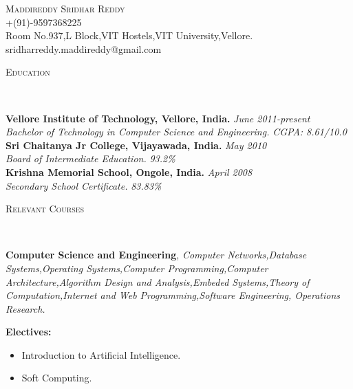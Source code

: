 \documentclass[9pt]{article}
\newenvironment{changemargin}[2]{%
  \begin{list}{}{%
    \setlength{\topsep}{0pt}%
    \setlength{\leftmargin}{#1}%
    \setlength{\rightmargin}{#2}%
    \setlength{\listparindent}{\parindent}%
    \setlength{\itemindent}{\parindent}%
    \setlength{\parsep}{\parskip}%
  }%
  \item[]}{\end{list}
}
\newcommand{\lineover}{
	\begin{changemargin}{-0.05in}{-0.05in}
		\vspace*{-8pt}
		\hrulefill \\
		\vspace*{-2pt}
	\end{changemargin}
}
\newcommand{\header}[1]{
	\begin{changemargin}{-0.5in}{-0.5in}
		\scshape{#1}\\
  	\lineover
	\end{changemargin}
}
\newcommand{\contact}[4]{
	\begin{changemargin}{-0.5in}{-0.5in}
		\begin{center}
			{\Large \scshape {#1}}\\ \smallskip
			{#2}\\ \smallskip 
			{#3}\\ \smallskip
			{#4}\smallskip
		\end{center}
	\end{changemargin}
}
\newenvironment{body} {
	\vspace*{-16pt}
	\begin{changemargin}{-0.25in}{-0.5in}
  }	
	{\end{changemargin}
}
\begin{document}
\contact{Maddireddy Sridhar Reddy}{+(91)-9597368225}{Room No.937,L Block,VIT Hostels,VIT University,Vellore.}{sridharreddy.maddireddy@gmail.com}





\header{Education}

\begin{body}
	\vspace{14pt}
	\textbf{Vellore Institute of Technology, Vellore, India.  }{} \hfill \emph{June 2011-present}{} \\
	\emph{Bachelor of Technology in Computer Science and Engineering.}{} \hfill \emph{CGPA: 8.61/10.0}\\
  \medskip
	\textbf{Sri Chaitanya Jr College, Vijayawada, India.} \hfill \emph{May 2010} \\
	\emph{Board of Intermediate Education.} \hfill \emph{93.2\%}\\
 \medskip
	\textbf{Krishna Memorial School, Ongole, India.} \hfill \emph{April 2008} \\
	\emph{Secondary School Certificate.} \hfill \emph{83.83\%}\\
\end{body}

\header{Relevant Courses}

\begin{body}
	\vspace{14pt}
	\textbf{Computer Science and Engineering}, \emph{Computer Networks,Database Systems,Operating Systems,Computer Programming,Computer Architecture,Algorithm Design and Analysis,Embeded Systems,Theory of Computation,Internet and Web Programming,Software Engineering, Operations Research.}\\
	\vspace*{-4pt}
	\medskip

	\textbf {Electives:}
	\vspace*{-4pt}
	\begin{itemize} \itemsep -0pt
		\item Introduction to Artificial Intelligence.
		\item Soft Computing.
	\end{itemize}
\end{body}

\end{document}
